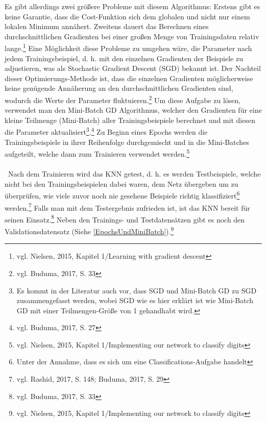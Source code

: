 \documentclass[
	a4paper,
	12pt,
	ngerman,
	oneside
]{scrreprt}											%
\newcommand{\fundamentals}[1]{vgl. Buduma, 2017, S. {#1}}
\begin{document}
			Es gibt allerdings zwei größere Probleme mit diesem Algorithmus: Erstens gibt es keine Garantie, dass die Cost-Funktion sich dem globalen und nicht nur einem lokalen Minimum annähert. Zweitens dauert das Berechnen eines durchschnittlichen Gradienten bei einer großen Menge von Trainingsdaten relativ lange.\footnote{vgl. Nielsen, 2015, Kapitel 1/Learning with gradient descent} Eine Möglichkeit diese Probleme zu umgehen wäre, die Parameter nach jedem Trainingsbeispiel, d. h. mit den einzelnen Gradienten der Beispiele zu adjustieren, was als Stochastic Gradient Descent (SGD) bekannt ist. Der Nachteil dieser Optimierungs-Methode ist, dass die einzelnen Gradienten möglicherweise keine genügende Annäherung an den durchschnittlichen Gradienten sind, wodurch die Werte der Parameter fluktuieren.\footnote{\fundamentals{33}} Um diese Aufgabe zu lösen, verwendet man den Mini-Batch GD Algorithmus, welcher den Gradienten für eine kleine Teilmenge (Mini-Batch) aller Trainingsbeispiele berechnet und mit diesen die Parameter aktualisiert\footnote{Es kommt in der Literatur auch vor, dass SGD und Mini-Batch GD zu SGD zusammengefasst werden, wobei SGD wie es hier erklärt ist wie Mini-Batch GD mit einer Teilmengen-Größe von 1 gehandhabt wird.}.\footnote{\fundamentals{27}} Zu Beginn eines Epochs werden die Trainingsbeispiele in ihrer Reihenfolge durchgemischt und in die Mini-Batches aufgeteilt, welche dann zum Trainieren verwendet werden.\footnote{vgl. Nielsen, 2015, Kapitel 1/Implementing our network to classify digits}
			\\\
			\\\
			Nach dem Trainieren wird das KNN getest, d. h. es werden Testbeispiele, welche nicht bei den Trainingsbeispielen dabei waren, dem Netz übergeben um zu überprüfen, wie viele zuvor noch nie gesehene Beispiele richtig klassifiziert\footnote{Unter der Annahme, dass es sich um eine Classifications-Aufgabe handelt} werden.\footnote{vgl. Rashid, 2017, S. 148; Buduma, 2017, S. 29} Falls man mit dem Testergebnis zufrieden ist, ist das KNN bereit für seinen Einsatz.\footnote{\fundamentals{33}} Neben den Trainings- und Testdatensätzen gibt es noch den Validationsdatensatz (Siehe \ref{EpochsUndMiniBatch}).\footnote{vgl. Nielsen, 2015, Kapitel 1/Implementing our network to classify digits}

	
\end{document}
